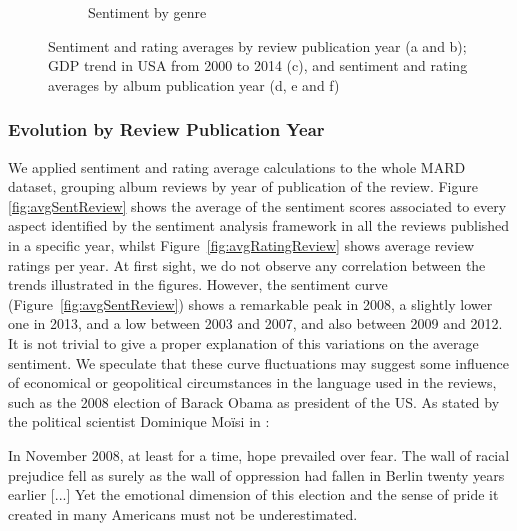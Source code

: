 \begin{figure}[ht!]
\begin{subfigure}{.3\textwidth}
        \caption{Sentiment by genre}
        \label{fig:avgSentimentGenresRelease}
    \end{subfigure}
    \caption{Sentiment and rating averages by review publication year (a and b); GDP trend in USA from 2000 to 2014 (c), and sentiment and rating averages by album publication year (d, e and f)}
\end{figure}

\subsubsection{Evolution by Review Publication Year}

We applied sentiment and rating average calculations to the whole MARD dataset, grouping album reviews by year of publication of the review. Figure \ref{fig:avgSentReview} shows the average of the sentiment scores associated to every aspect identified by the sentiment analysis framework in all the reviews published in a specific year, whilst Figure~\ref{fig:avgRatingReview} shows average review ratings per year. At first sight, we do not observe any correlation between the trends illustrated in the figures. However, the sentiment curve (Figure~\ref{fig:avgSentReview}) shows a remarkable peak in 2008, a slightly lower one in 2013, and a low between 2003 and 2007, and also between 2009 and 2012. %
It is not trivial to give a proper explanation of this variations on the average sentiment. We speculate that these curve fluctuations may suggest some influence of economical or geopolitical circumstances in the language used in the reviews, such as the 2008 election of Barack Obama as president of the US. As stated by the political scientist Dominique Mo\"{i}si in \cite{Moisi2010}:

\begin{displayquote}\small{
In November 2008, at least for a time, hope prevailed over fear. The wall of racial prejudice fell as surely as the wall of oppression had fallen in Berlin twenty years earlier [...] Yet the emotional dimension of this election and the sense of pride it created in many Americans must not be underestimated.}
\end{displayquote}

